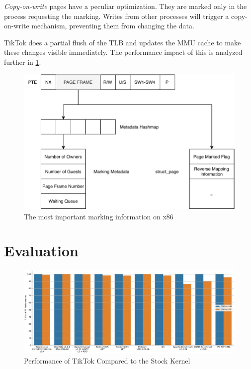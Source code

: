 \emph{Copy-on-write} pages have a peculiar optimization. They are marked only in
the process requesting the marking. Writes from other processes will trigger a
copy-on-write mechanism, preventing them from changing the data.

TikTok does a partial flush of the TLB and updates the MMU cache to make these
changes visible immediately. The performance impact of this is analyzed further
in \cref{sec:evaluation}.

\begin{figure}[]
  \centering
  \includegraphics[width=\linewidth]{img/book-keeping.pdf}
  \caption{The most important marking information on x86}
  \label{fig:bookkeeping}
\end{figure}

\section{Evaluation}
\label{sec:evaluation}

\begin{figure}[]
  \centering
  \includegraphics[width=\linewidth]{img/eval.pdf}
  \caption{Performance of TikTok Compared to the Stock Kernel}
  \label{fig:tiktokeval}
\end{figure}

